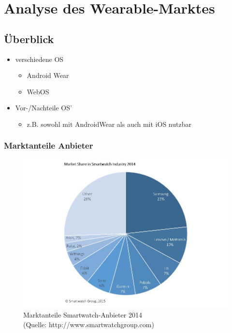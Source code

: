 \chapter{Analyse des Wearable-Marktes}
\section{Überblick}
	\begin{itemize}
		\item verschiedene OS
			\begin{itemize}
				\item Android Wear
				\item WebOS
			\end{itemize}
		\item Vor-/Nachteile OS'
			\begin{itemize}
				\item z.B. sowohl mit AndroidWear als auch mit iOS nutzbar
			\end{itemize}
	\end{itemize}

\subsection{Marktanteile Anbieter}
\begin{figure}[h!]
	\includegraphics{Bilder/Market_Share_Smartwatch_Companies_2014}
	\caption[Marktanteile Smartwatch-Anbieter 2014]{Marktanteile Smartwatch-Anbieter 2014\\\hspace{\textwidth}(Quelle: http://www.smartwatchgroup.com)}
\end{figure}

